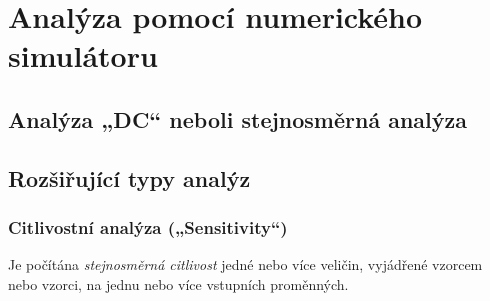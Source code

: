 {          %
              

              
          \newpage
              

  \section{Analýza pomocí numerického simulátoru}
    \subsection{Analýza „DC“ neboli stejnosměrná analýza}
    \subsection{Rozšiřující typy analýz}
      \subsubsection{Citlivostní analýza („Sensitivity“)}
        Je počítána \emph{stejnosměrná citlivost} jedné nebo více veličin, vyjádřené vzorcem nebo 
        vzorci, na jednu nebo více vstupních proměnných.

              
} %

\printbibliography[title={Seznam literatury}, heading=subbibliography]
